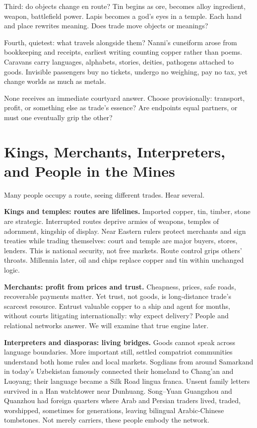 Third: do objects change en route? Tin begins as ore, becomes alloy ingredient, weapon, battlefield power. Lapis becomes a god's eyes in a temple. Each hand and place rewrites meaning. Does trade move objects or meanings?

Fourth, quietest: what travels alongside them? Nanni's cuneiform arose from bookkeeping and receipts, earliest writing counting copper rather than poems. Caravans carry languages, alphabets, stories, deities, pathogens attached to goods. Invisible passengers buy no tickets, undergo no weighing, pay no tax, yet change worlds as much as metals.

None receives an immediate courtyard answer. Choose provisionally: transport, profit, or something else as trade's essence? Are endpoints equal partners, or must one eventually grip the other?

\section[Kings, Traders, Interpreters, Miners]{Kings, Merchants, Interpreters, and People in the Mines}
Many people occupy a route, seeing different trades. Hear several.

\textbf{Kings and temples: routes are lifelines.} Imported copper, tin, timber, stone are strategic. Interrupted routes deprive armies of weapons, temples of adornment, kingship of display. Near Eastern rulers protect merchants and sign treaties while trading themselves: court and temple are major buyers, stores, lenders. This is national security, not free markets. Route control grips others' throats. Millennia later, oil and chips replace copper and tin within unchanged logic.

\textbf{Merchants: profit from prices and trust.} Cheapness, prices, safe roads, recoverable payments matter. Yet trust, not goods, is long-distance trade's scarcest resource. Entrust valuable copper to a ship and agent for months, without courts litigating internationally: why expect delivery? People and relational networks answer. We will examine that true engine later.

\textbf{Interpreters and diasporas: living bridges.} Goods cannot speak across language boundaries. More important still, settled compatriot communities understand both home rules and local markets. Sogdians from around Samarkand in today's Uzbekistan famously connected their homeland to Chang'an and Luoyang; their language became a Silk Road lingua franca. Unsent family letters survived in a Han watchtower near Dunhuang. Song--Yuan Guangzhou and Quanzhou had foreign quarters where Arab and Persian traders lived, traded, worshipped, sometimes for generations, leaving bilingual Arabic-Chinese tombstones. Not merely carriers, these people embody the network.

